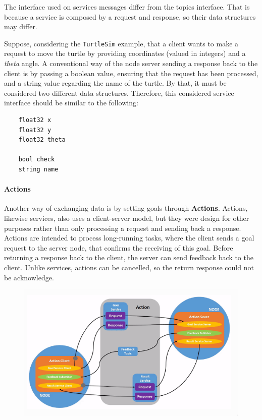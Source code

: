                 
The interface used on services messages differ from the topics interface. That is because a service is composed by a request and response, so their data structures may differ. 

Suppose, considering the \texttt{TurtleSim} example, that a client wants to make a request to move the turtle by providing coordinates (valued in integers) and a \textit{theta} angle. A conventional way of the node server sending a response back to the client is by passing a boolean value, ensuring that the request has been processed, and a string value regarding the name of the turtle. By that, it must be considered two different data structures. Therefore, this considered service interface should be similar to the following:

\begin{verbatim}
    float32 x
    float32 y
    float32 theta
    ---
    bool check
    string name
\end{verbatim}

\paragraph{Actions}

Another way of exchanging data is by setting goals through \textbf{Actions}. Actions, likewise services, also uses a client-server model, but they were design for other purposes rather than only processing a request and sending back a response. Actions are intended to process long-running tasks, where the client sends a goal request to the server node, that confirms the receiving of this goal. Before returning a response back to the client, the server can send feedback back to the client. Unlike services, actions can be cancelled, so the return response could not be acknowledge. 

\begin{figure}[H]
    \centering
    \includegraphics[width=0.7\linewidth]{images/ros2-actions.png}
\end{figure}

